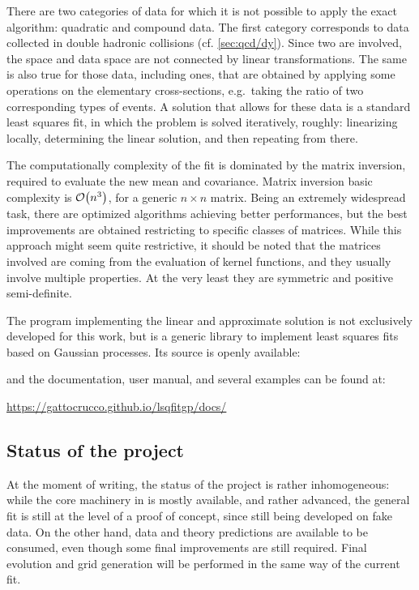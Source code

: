 There are two categories of data for which it is not possible to apply the
exact algorithm: quadratic and compound data.
%
The first category corresponds to data collected in double hadronic collisions
(cf. \cref{sec:qcd/dy}).
Since two \pdfs are involved, the \pdf space and data space are not connected
by linear transformations.
%
The same is also true for those data, including \dis ones, that are obtained by
applying some operations on the elementary cross-sections, e.g.\ taking the
ratio of two corresponding types of events.
%
A solution that allows for these data is a standard least squares fit, in which
the problem is solved iteratively, roughly: linearizing locally, determining
the linear solution, and then repeating from there.

The computationally complexity of the fit is dominated by the matrix inversion,
required to evaluate the new mean and covariance.
%
Matrix inversion basic complexity is $\order{n^3}$, for a generic $n \times n$
matrix.
Being an extremely widespread task, there are optimized algorithms achieving
better performances, but the best improvements are obtained restricting to
specific classes of matrices.
%
While this approach might seem quite restrictive, it should be noted that the
matrices involved are coming from the evaluation of kernel functions, and they
usually involve multiple properties. 
At the very least they are symmetric and positive semi-definite.

The program implementing the linear and approximate solution is not exclusively
developed for this work, but is a generic library to implement least squares
fits based on Gaussian processes.
Its source is openly available:
\begin{center}
\end{center}
and the documentation, user manual, and several examples can be found at:
\begin{center}
  \url{https://gattocrucco.github.io/lsqfitgp/docs/}
\end{center}

\subsection{Status of the project}
\label{sec:gp/status}

At the moment of writing, the status of the project is rather inhomogeneous:
while the core machinery in \lsqfitgp is mostly available, and rather advanced,
the general fit is still at the level of a proof of concept, since still being
developed on fake data.
%
On the other hand, data and theory predictions are available to be consumed,
even though some final improvements are still required.
%
Final evolution and grid generation will be performed in the same way of the
\nnpdf current fit.

